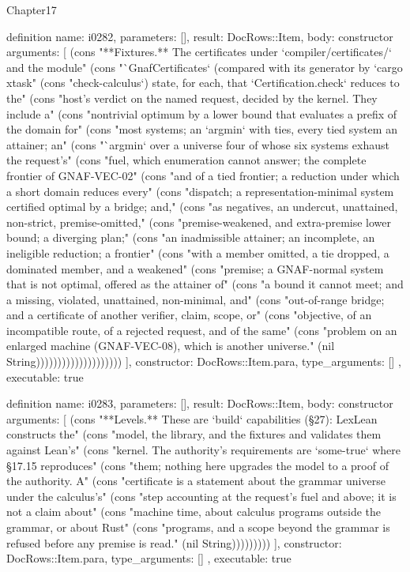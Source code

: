 \begin{lexlean}{Chapter17}
\begin{semanticmodule}
definition{
  name: i0282,
  parameters: [],
  result: DocRows::Item,
  body: constructor{
    arguments: [
      (cons "**Fixtures.** The certificates under `compiler/certificates/` and the module" (cons "`GnafCertificates` (compared with its generator by `cargo xtask" (cons "check-calculus`) state, for each, that `Certification.check` reduces to the" (cons "host's verdict on the named request, decided by the kernel. They include a" (cons "nontrivial optimum by a lower bound that evaluates a prefix of the domain for" (cons "most systems; an `argmin` with ties, every tied system an attainer; an" (cons "`argmin` over a universe four of whose six systems exhaust the request's" (cons "fuel, which enumeration cannot answer; the complete frontier of GNAF-VEC-02" (cons "and of a tied frontier; a reduction under which a short domain reduces every" (cons "dispatch; a representation-minimal system certified optimal by a bridge; and," (cons "as negatives, an undercut, unattained, non-strict, premise-omitted," (cons "premise-weakened, and extra-premise lower bound; a diverging plan;" (cons "an inadmissible attainer; an incomplete, an ineligible reduction; a frontier" (cons "with a member omitted, a tie dropped, a dominated member, and a weakened" (cons "premise; a GNAF-normal system that is not optimal, offered as the attainer of" (cons "a bound it cannot meet; and a missing, violated, unattained, non-minimal, and" (cons "out-of-range bridge; and a certificate of another verifier, claim, scope, or" (cons "objective, of an incompatible route, of a rejected request, and of the same" (cons "problem on an enlarged machine (GNAF-VEC-08), which is another universe." (nil String))))))))))))))))))))
    ],
    constructor: DocRows::Item.para,
    type_arguments: []
  },
  executable: true
}

definition{
  name: i0283,
  parameters: [],
  result: DocRows::Item,
  body: constructor{
    arguments: [
      (cons "**Levels.** These are `build` capabilities (§27): LexLean constructs the" (cons "model, the library, and the fixtures and validates them against Lean's" (cons "kernel. The authority's requirements are `some-true` where §17.15 reproduces" (cons "them; nothing here upgrades the model to a proof of the authority. A" (cons "certificate is a statement about the grammar universe under the calculus's" (cons "step accounting at the request's fuel and above; it is not a claim about" (cons "machine time, about calculus programs outside the grammar, or about Rust" (cons "programs, and a scope beyond the grammar is refused before any premise is read." (nil String)))))))))
    ],
    constructor: DocRows::Item.para,
    type_arguments: []
  },
  executable: true
}


\end{semanticmodule}
\end{lexlean}
